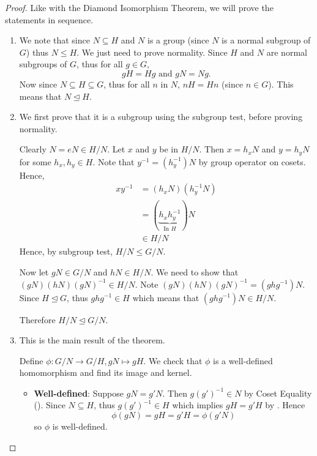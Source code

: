 \begin{proof}
    Like with the Diamond Isomorphism Theorem, we will prove the statements in sequence.

    \begin{enumerate}
        \item We note that since $N \subseteq H$ and $N$ is a group (since $N$ is a normal subgroup of $G$) thus $N \leq H$. We just need to prove normality. Since $H$ and $N$ are normal subgroups of $G$, thus for all $g \in G$,
        \[
            gH = Hg \text{ and } gN = Ng.
        \]
        Now since $N \subseteq H \subseteq G$, thus for all $n$ in $N$, $nH = Hn$ (since $n \in G$). This means that $N \unlhd H$.

        \item We first prove that it is a subgroup using the subgroup test, before proving normality.

        Clearly $N = eN \in H/N$. Let $x$ and $y$ be in $H/N$. Then $x=h_xN$ and $y=h_yN$ for some $h_x, h_y \in H$. Note that $y^{-1} = (h_y^{-1})N$ by group operator on cosets. Hence,
        \begin{align*}
            xy^{-1} &= (h_xN)(h_y^{-1}N)\\
            &= (\underbrace{h_xh_y^{-1}}_{\text{In }H})N\\
            &\in H/N
        \end{align*}
        Hence, by subgroup test, $H/N \leq G/N$.

        Now let $gN \in G/N$ and $hN \in H/N$. We need to show that $(gN)(hN)(gN)^{-1} \in H/N$. Note $(gN)(hN)(gN)^{-1} = (ghg^{-1})N$. Since $H \unlhd G$, thus $ghg^{-1} \in H$ which means that $(ghg^{-1})N \in H/N$.

        Therefore $H/N \unlhd G/N$.

        \item This is the main result of the theorem.

        Define $\phi: G/N \to G/H, gN \mapsto gH$. We check that $\phi$ is a well-defined homomorphism and find its image and kernel.
        \begin{itemize}
            \item \textbf{Well-defined}: Suppose $gN = g'N$. Then $g(g')^{-1} \in N$ by Coset Equality (). Since $N \subseteq H$, thus $g(g')^{-1} \in H$ which implies $gH = g'H$ by . Hence
            \[
                \phi(gN) = gH = g'H = \phi(g'N)
            \]
            so $\phi$ is well-defined.


\end{itemize}
\end{enumerate}
\end{proof}
